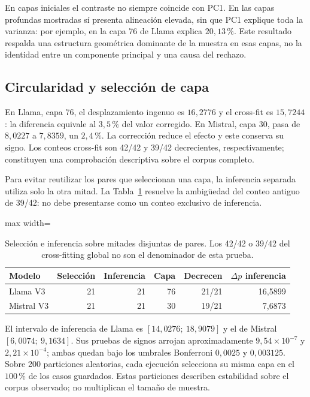 En capas iniciales el contraste no siempre coincide con PC1. En las capas profundas mostradas sí presenta alineación elevada, sin que PC1 explique toda la varianza: por ejemplo, en la capa 76 de Llama explica $20{,}13\,\%$. Este resultado respalda una estructura geométrica dominante de la muestra en esas capas, no la identidad entre un componente principal y una causa del rechazo.

\subsection{Circularidad y selección de capa}

En Llama, capa 76, el desplazamiento ingenuo es $16{,}2776$ y el cross-fit es $15{,}7244$: la diferencia equivale al $3{,}5\,\%$ del valor corregido. En Mistral, capa 30, pasa de $8{,}0227$ a $7{,}8359$, un $2{,}4\,\%$. La corrección reduce el efecto y este conserva su signo. Los conteos cross-fit son 42/42 y 39/42 decrecientes, respectivamente; constituyen una comprobación descriptiva sobre el corpus completo.

Para evitar reutilizar los pares que seleccionan una capa, la inferencia separada utiliza solo la otra mitad. La Tabla~\ref{tab:seleccion} resuelve la ambigüedad del conteo antiguo de 39/42: no debe presentarse como un conteo exclusivo de inferencia.
\begin{table}[htbp]\centering\small
\begin{adjustbox}{max width=\textwidth}
\begin{tabular}{@{}lrrrrr@{}}\toprule
Modelo & Selección & Inferencia & Capa & Decrecen & $\Delta p$ inferencia \\\midrule
Llama V3 & 21 & 21 & 76 & 21/21 & 16{,}5899 \\
Mistral V3 & 21 & 21 & 30 & 19/21 & 7{,}6873 \\
\bottomrule\end{tabular}\end{adjustbox}
\caption{Selección e inferencia sobre mitades disjuntas de pares. Los 42/42 o 39/42 del cross-fitting global no son el denominador de esta prueba.}\label{tab:seleccion}\end{table}

El intervalo de inferencia de Llama es $[14{,}0276;\ 18{,}9079]$ y el de Mistral $[6{,}0074;\ 9{,}1634]$. Sus pruebas de signos arrojan aproximadamente $9{,}54\times10^{-7}$ y $2{,}21\times10^{-4}$; ambas quedan bajo los umbrales Bonferroni $0{,}0025$ y $0{,}003125$. Sobre 200 particiones aleatorias, cada ejecución selecciona su misma capa en el $100\,\%$ de los casos guardados. Estas particiones describen estabilidad sobre el corpus observado; no multiplican el tamaño de muestra.

